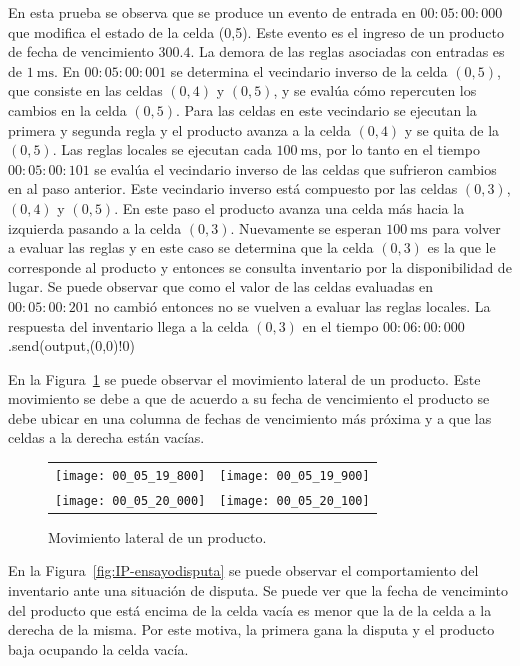 \documentclass[10pt]{article}
\begin{document}
En esta prueba se observa que se produce un evento de entrada en $00:05:00:000$ que modifica el estado de la celda (0,5). Este evento es el ingreso de un producto de fecha de vencimiento $300.4$. La demora de las reglas asociadas con entradas es de $1~\textrm{ms}$. En $00:05:00:001$ se determina el vecindario inverso de la celda $(0,5)$, que consiste en las celdas $(0,4)$ y $(0,5)$, y se evalúa cómo repercuten los cambios en la celda $(0,5)$. Para las celdas en este vecindario se ejecutan la primera y segunda regla y el producto avanza a la celda $(0,4)$ y se quita de la $(0,5)$. Las reglas locales se ejecutan cada $100~\textrm{ms}$, por lo tanto en el tiempo $00:05:00:101$ se evalúa el vecindario inverso de las celdas que sufrieron cambios en al paso anterior. Este vecindario inverso está compuesto por las celdas $(0,3)$, $(0,4)$ y $(0,5)$. En este paso el producto avanza una celda más hacia la izquierda pasando a la celda $(0,3)$. Nuevamente se esperan $100~\textrm{ms}$ para volver a evaluar las reglas y en este caso se determina que la celda $(0,3)$ es la que le corresponde al producto y entonces se consulta inventario por la disponibilidad de lugar. Se puede observar que como el valor de las celdas evaluadas en $00:05:00:201$ no cambió entonces no se vuelven a evaluar las reglas locales. La respuesta del inventario llega a la celda $(0,3)$ en el tiempo $00:06:00:000$.send(output,(0,0)!0)


En la Figura~\ref{fig:IP-movimiento} se puede observar el movimiento lateral de un producto. Este movimiento se debe a que de acuerdo a su fecha de vencimiento el producto se debe ubicar en una columna de fechas de vencimiento más próxima y a que las celdas a la derecha están vacías.

 \begin{figure}[h] 
 \centering
 
 	\begin{tabular}{cc}
 		\texttt{[image: 00\_05\_19\_800]} &
 		\texttt{[image: 00\_05\_19\_900]} \\[5mm]
 		\texttt{[image: 00\_05\_20\_000]} &
 		\texttt{[image: 00\_05\_20\_100]} \\
 	\end{tabular}
 	
 	\caption{Movimiento lateral de un producto.} 
 	\label{fig:IP-movimiento} 
 \end{figure}
 \FloatBarrier

En la Figura~\ref{fig:IP-ensayodisputa} se puede observar el comportamiento del inventario ante una situación de disputa. Se puede ver que la fecha de venciminto del producto que está encima de la celda vacía es menor que la de la celda a la derecha de la misma. Por este motiva, la primera gana la disputa y el producto baja ocupando la celda vacía.
\end{document}
